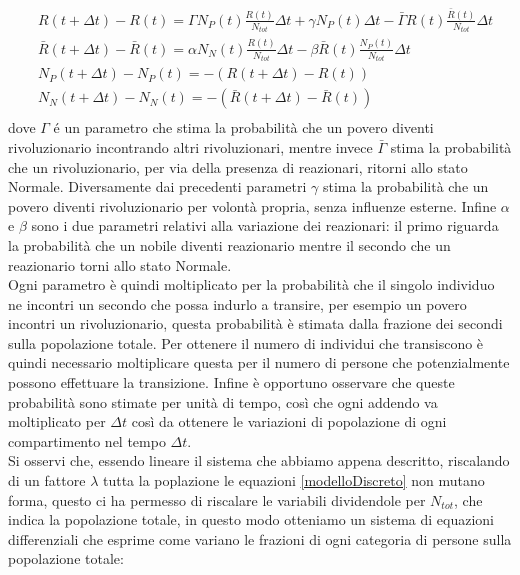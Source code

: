 \begin{equation}\label{modelloDiscreto}
	\begin{aligned}
		 &R(t+\Delta t)-R(t)=\Gamma N_P(t) \frac{R(t)}{N_{tot}}\Delta t+\gamma N_P(t)\Delta t-\bar{\Gamma}R(t)\frac{\bar{R}(t)}{N_{tot}}\Delta t\\
		&\bar{R}(t+\Delta t)-\bar{R}(t)=\alpha N_N(t)\frac{R(t)}{N_{tot}}\Delta t-\beta \bar{R}(t)\frac{N_P(t)}{N_{tot}}\Delta t\\
		&N_P(t+\Delta t)-N_P(t)=-(R(t+\Delta t)-R(t))\\
		&N_N(t+\Delta t)-N_N(t)=-(\bar{R}(t+\Delta t)-\bar{R}(t))\\
	\end{aligned}     
\end{equation}	
dove $ \Gamma $ é un parametro che stima la probabilità che un povero diventi rivoluzionario incontrando altri rivoluzionari, mentre invece $ \bar{\Gamma} $ stima la probabilità che un rivoluzionario, per via della presenza di reazionari, ritorni allo stato Normale.  Diversamente dai precedenti parametri $\gamma$ stima la probabilità che un povero diventi rivoluzionario per volontà propria, senza influenze esterne. Infine $ \alpha $ e $ \beta $ sono i due parametri relativi alla variazione dei reazionari: il primo riguarda la probabilità che un nobile diventi reazionario mentre il secondo che un reazionario torni allo stato Normale. \\
Ogni parametro è quindi moltiplicato per la probabilità che il singolo individuo ne incontri un secondo che possa indurlo a transire, per esempio un povero incontri un rivoluzionario, questa probabilità è stimata dalla frazione dei secondi sulla popolazione totale. Per ottenere il numero di individui che transiscono è quindi necessario moltiplicare questa per il numero di persone che potenzialmente possono effettuare la transizione. Infine è opportuno osservare che queste probabilità sono stimate per unità di tempo, così che ogni addendo va moltiplicato per $\Delta t$ così da ottenere le variazioni di popolazione di ogni compartimento nel tempo $\Delta t$.\\


Si osservi che, essendo lineare il sistema che abbiamo appena descritto, riscalando di un fattore $\lambda$ tutta la poplazione le equazioni \ref{modelloDiscreto} non mutano forma, questo ci ha permesso di riscalare le variabili dividendole per $ N_{tot}$, che indica la popolazione totale, in questo modo otteniamo un sistema di equazioni differenziali che esprime come variano le frazioni di ogni categoria di persone sulla popolazione totale:  

